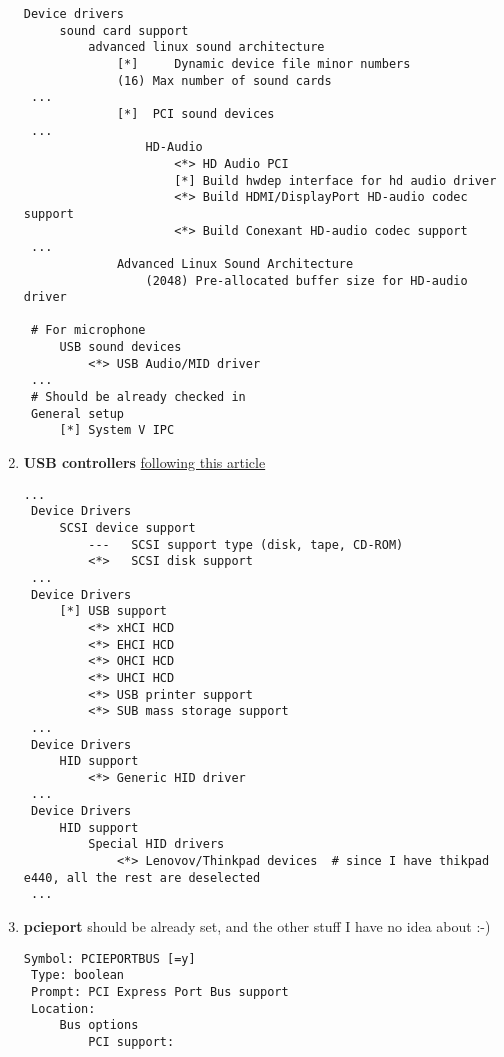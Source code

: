 \documentclass[11pt,a4paper]{article}
\begin{document}
\begin{enumerate}
                       \begin{lstlisting}[style=KernelConfig]
 Device drivers
     sound card support
         advanced linux sound architecture
             [*]     Dynamic device file minor numbers
             (16) Max number of sound cards
 ...
             [*]  PCI sound devices
 ...
                 HD-Audio
                     <*> HD Audio PCI
                     [*] Build hwdep interface for hd audio driver
                     <*> Build HDMI/DisplayPort HD-audio codec support
                     <*> Build Conexant HD-audio codec support
 ...
             Advanced Linux Sound Architecture
                 (2048) Pre-allocated buffer size for HD-audio driver

 # For microphone
     USB sound devices
         <*> USB Audio/MID driver
 ...
 # Should be already checked in
 General setup
     [*] System V IPC
                       \end{lstlisting}

                   \newpage
                   \item \textbf{USB controllers}  \href{https://wiki.gentoo.org/wiki/USB/Guide#Config_options_for_the_kernel}{following this article}

                       \begin{lstlisting}[style=KernelConfig]
 ...
 Device Drivers
     SCSI device support
         ---   SCSI support type (disk, tape, CD-ROM)
         <*>   SCSI disk support
 ...
 Device Drivers
     [*] USB support
         <*> xHCI HCD
         <*> EHCI HCD
         <*> OHCI HCD
         <*> UHCI HCD
         <*> USB printer support
         <*> SUB mass storage support
 ...
 Device Drivers
     HID support
         <*> Generic HID driver
 ...
 Device Drivers
     HID support
         Special HID drivers
             <*> Lenovov/Thinkpad devices  # since I have thikpad e440, all the rest are deselected
 ...
                       \end{lstlisting}

                   \newpage
                   \item \textbf{pcieport} should be already set, and the other stuff I have no idea about :-)

                       \begin{lstlisting}[style=KernelConfig]
 Symbol: PCIEPORTBUS [=y]
 Type: boolean
 Prompt: PCI Express Port Bus support
 Location:
     Bus options
         PCI support:
                       \end{lstlisting}


\end{enumerate}
\end{document}
